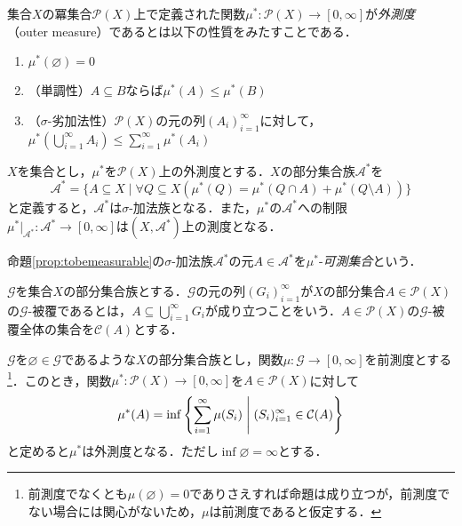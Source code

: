 \documentclass[12pt,a4paper]{jsarticle}
\begin{document}
集合$X$の冪集合$\mathcal{P}(X)$上で定義された関数$\mu^*: \mathcal{P}(X) \to [0, \infty]$が\emph{外測度}（outer measure）であるとは以下の性質をみたすことである．
\begin{enumerate}
    \item $\mu^*(\varnothing) = 0$
    \item （単調性）$A \subseteq B$ならば$\mu^*(A) \leq \mu^*(B)$
    \item （$\sigma$-劣加法性）$\mathcal{P}(X)$の元の列$(A_i)_{i = 1}^\infty$に対して，$\mu^*\left(\bigcup_{i = 1}^\infty A_i\right) \leq \sum_{i = 1}^\infty \mu^*(A_i)$
\end{enumerate}

\begin{proposition}\label{prop:tobemeasurable}
    $X$を集合とし，$\mu^*$を$\mathcal{P}(X)$上の外測度とする．$X$の部分集合族$\mathcal{A}^*$を
    \begin{equation*}
        \mathcal{A}^* = \{A \subseteq X \mid \forall Q \subseteq X(\mu^*(Q) = \mu^*(Q \cap A) + \mu^*(Q \setminus A))\}
    \end{equation*}
    と定義すると，$\mathcal{A}^*$は$\sigma$-加法族となる．また，$\mu^*$の$\mathcal{A}^*$への制限$\mu^*|_{\mathcal{A}^*}:\mathcal{A}^* \to [0, \infty]$は$(X, \mathcal{A}^*)$上の測度となる．
\end{proposition}

命題\ref{prop:tobemeasurable}の$\sigma$-加法族$\mathcal{A}^*$の元$A \in \mathcal{A}^*$を$\mu^*$-\emph{可測集合}という．

$\mathcal{G}$を集合$X$の部分集合族とする．$\mathcal{G}$の元の列$(G_i)_{i = 1}^\infty$が$X$の部分集合$A \in \mathcal{P}(X)$の$\mathcal{G}$-被覆であるとは，$A \subseteq \bigcup_{i = 1}^\infty G_i$が成り立つことをいう．$A \in \mathcal{P}(X)$の$\mathcal{G}$-被覆全体の集合を$\mathcal{C}(A)$とする．

\begin{proposition}\label{prop:inducedoutermeasure}
    $\mathcal{G}$を$\varnothing \in \mathcal{G}$であるような$X$の部分集合族とし，関数$\mu: \mathcal{G} \to [0, \infty]$を前測度とする\footnote{前測度でなくとも$\mu(\varnothing) = 0$でありさえすれば命題は成り立つが，前測度でない場合には関心がないため，$\mu$は前測度であると仮定する．}．このとき，関数$\mu^*:\mathcal{P}(X) \to [0, \infty]$を$A \in \mathcal{P}(X)$に対して
    \begin{equation*}
        \mu^*(A) = \inf \left\{\sum_{i = 1}^\infty \mu(S_i) \mathrel{}\middle|\mathrel{} (S_i)_{i = 1}^\infty \in \mathcal{C}(A)\right\}
    \end{equation*}
    と定めると$\mu^*$は外測度となる．ただし$\inf \varnothing = \infty$とする．
\end{proposition}
\end{document}
